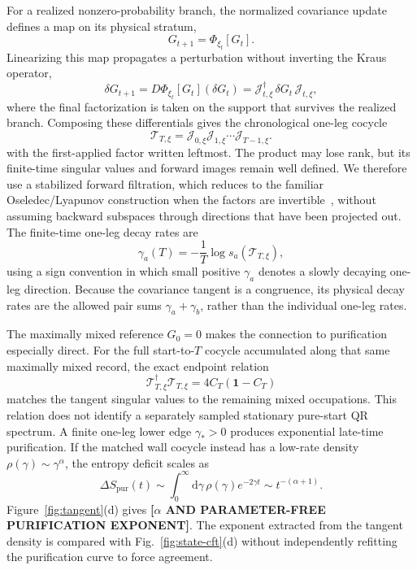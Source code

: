 \documentclass[aps,prx,twocolumn,superscriptaddress,longbibliography,nofootinbib,floatfix]{revtex4-2}
\newcommand{\Id}{\mathbf{1}}
\newcommand{\cJ}{\mathcal{J}}
\newcommand{\cT}{\mathcal{T}}
\newcommand{\dd}{\mathrm{d}}
\newcommand{\ResultValue}[1]{\textcolor{BrickRed}{\textbf{[#1]}}}
\begin{document}
For a realized nonzero-probability branch, the normalized covariance update defines a map on its physical stratum,
\begin{equation}
 G_{t+1}=\Phi_{\xi_t}[G_t].
 \label{eq:normalized-map}
\end{equation}
Linearizing this map propagates a perturbation without inverting the Kraus operator,
\begin{equation}
 \delta G_{t+1}
 =D\Phi_{\xi_t}[G_t](\delta G_t)
 =\cJ_{t,\xi}^{\dagger}\,\delta G_t\,\cJ_{t,\xi},
 \label{eq:tangent-map}
\end{equation}
where the final factorization is taken on the support that survives the realized branch.  Composing these differentials gives the chronological one-leg cocycle
\begin{equation}
 \cT_{T,\xi}=\cJ_{0,\xi}\cJ_{1,\xi}\cdots\cJ_{T-1,\xi}.
 \label{eq:tangent-product}
\end{equation}
with the first-applied factor written leftmost.  The product may lose rank, but its finite-time singular values and forward images remain well defined.  We therefore use a stabilized forward filtration, which reduces to the familiar Oseledec/Lyapunov construction when the factors are invertible~\cite{Oseledec1968,Ludwig2013}, without assuming backward subspaces through directions that have been projected out.  The finite-time one-leg decay rates are
\begin{equation}
 \gamma_a(T)=-\frac{1}{T}\log s_a(\cT_{T,\xi}),
 \label{eq:lyapunov}
\end{equation}
using a sign convention in which small positive $\gamma_a$ denotes a slowly decaying one-leg direction.  Because the covariance tangent is a congruence, its physical decay rates are the allowed pair sums $\gamma_a+\gamma_b$, rather than the individual one-leg rates.

The maximally mixed reference $G_0=0$ makes the connection to purification especially direct.  For the full start-to-$T$ cocycle accumulated along that same maximally mixed record, the exact endpoint relation
\begin{equation}
 \cT_{T,\xi}^{\dagger}\cT_{T,\xi}=4C_T(\Id-C_T)
 \label{eq:maxmix-tangent-relation}
\end{equation}
matches the tangent singular values to the remaining mixed occupations.  This relation does not identify a separately sampled stationary pure-start QR spectrum.  A finite one-leg lower edge $\gamma_*>0$ produces exponential late-time purification.  If the matched wall cocycle instead has a low-rate density $\rho(\gamma)\sim\gamma^\alpha$, the entropy deficit scales as
\begin{equation}
 \Delta S_{\mathrm{pur}}(t)
 \sim\int_0^\infty\dd\gamma\,\rho(\gamma)e^{-2\gamma t}
 \sim t^{-(\alpha+1)}.
 \label{eq:purification-density}
\end{equation}
Figure~\ref{fig:tangent}(d) gives \ResultValue{$\alpha$ AND PARAMETER-FREE PURIFICATION EXPONENT}.  The exponent extracted from the tangent density is compared with Fig.~\ref{fig:state-cft}(d) without independently refitting the purification curve to force agreement.
\end{document}
